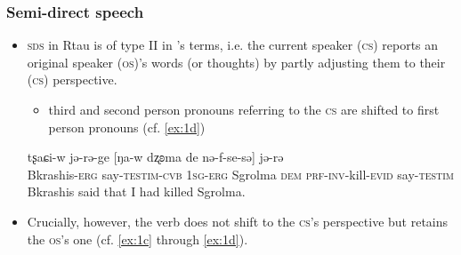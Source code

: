 \documentclass[xcolor=table]{beamer}
\newcommand{\ipa}[1]{{\phon #1}} %
\newcommand{\ipapl}[1]{{\phondroit #1}}
\newcommand{\conv}{\textsc{cvb}}
\newcommand{\const}{\textsc{testim}}
\newcommand{\dem}{\textsc{dem}}
\newcommand{\erg}{\textsc{erg}}
\newcommand{\evid}{\textsc{evid}}
\newcommand{\inv}{\textsc{inv}}
\newcommand{\prf}{\textsc{prf}}
\newcommand{\sg}{\textsc{sg}}
\begin{document}
\begin{frame}
\frametitle{Semi-direct speech}

\begin{itemize}
 \item \textsc{sds} in Rtau is of type II in \cite{aikhenvald08semidirect}'s terms, i.e. the current speaker (\textsc{cs}) reports an original speaker (\textsc{os})'s words (or thoughts) by partly adjusting them to their (\textsc{cs}) perspective. 

\begin{itemize}
\item third and second person pronouns referring to the \textsc{cs} are shifted to first person pronouns (cf. \ref{ex:1d})
\end{itemize}

\begin{exe}
\ex \label{ex:1d}
\gll
	\ipa{tʂaɕi-w}	\ipa{jə-rə-ge} [\ipapl{ŋa-w} \ipapl{dʐʚma} \ipapl{de} \ipapl{nə-f-se-sə}] \ipa{jə-rə}  \\
	{Bkrashis-\erg} {say-\const-\conv} {1\sg-\erg} Sgrolma {\dem} {\prf-\inv-kill-\evid} say-\const\\ 
	\glt Bkrashis said that I had killed Sgrolma.
\end{exe}

\item Crucially, however, the verb does not shift to the \textsc{cs}'s perspective but retains the \textsc{os}'s one (cf. \ref{ex:1c} through \ref{ex:1d}).

\end{itemize}
\end{frame}
\end{document}
